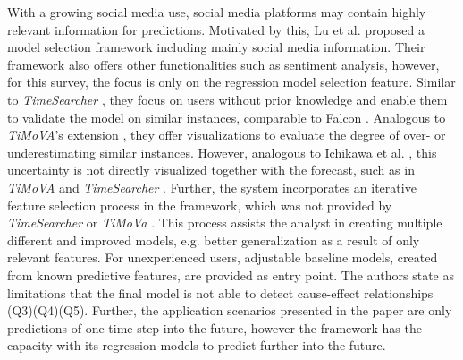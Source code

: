 \documentclass[electronic]{vgtc}             %
\begin{document}
With a growing social media use, social media platforms may contain highly relevant information for predictions. 
Motivated by this, Lu et al. \cite{lu:2014} proposed a model selection framework including mainly social media information. 
Their framework also offers other functionalities such as sentiment analysis, however, for this survey, the focus is only on the regression model selection feature.
Similar to \textit{TimeSearcher} \cite{buono:2007}, they focus on users without prior knowledge and enable them to validate the model on similar instances, comparable to Falcon \cite{steed:2017}. 
Analogous to \textit{TiMoVA}'s extension \cite{boegl:2014}, they offer visualizations to evaluate the degree of over- or underestimating similar instances.
However, analogous to Ichikawa et al. \cite{ichikawa:2002}, this uncertainty is not directly visualized together with the forecast, such as in \textit{TiMoVA} \cite{boegl:2013} and \textit{TimeSearcher} \cite{buono:2007}.
Further, the system incorporates an iterative feature selection process in the framework, which was not provided by \textit{TimeSearcher} \cite{buono:2007} or \textit{TiMoVa} \cite{boegl:2013}.
This process assists the analyst in creating multiple different and improved models, e.g. better generalization as a result of only relevant features.
For unexperienced users, adjustable baseline models, created from known predictive features, are provided as entry point.
The authors state as limitations that the final model is not able to detect cause-effect relationships (Q3)(Q4)(Q5). 
Further, the application scenarios presented in the paper are only predictions of one time step into the future, however the framework has the capacity with its regression models to predict further into the future.
\end{document}
